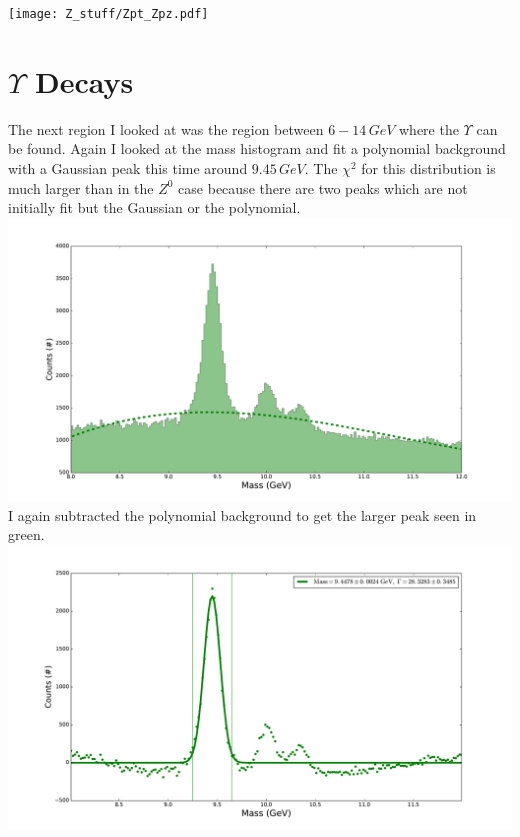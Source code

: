 \documentclass[a4paper, 11pt]{article}
\begin{document}
\texttt{[image: Z\_stuff/Zpt\_Zpz.pdf]} \\

\section*{$\Upsilon$ Decays}

The next region I looked at was the region between $6 - 14\,GeV$ where the $\Upsilon$ can be found. Again I looked at the mass histogram and fit a polynomial background with a Gaussian peak this time around $9.45\,GeV$. The $\chi^2$ for this distribution is much larger than in the $Z^0$ case because there are two peaks which are not initially fit but the Gaussian or the polynomial. \\

\includegraphics[width=\textwidth]{Upsilon/U_hist.pdf} \\

I again subtracted the polynomial background to get the larger peak seen in green.\\

\includegraphics[width=\textwidth]{Upsilon/U_peak.pdf} \\
\end{document}
